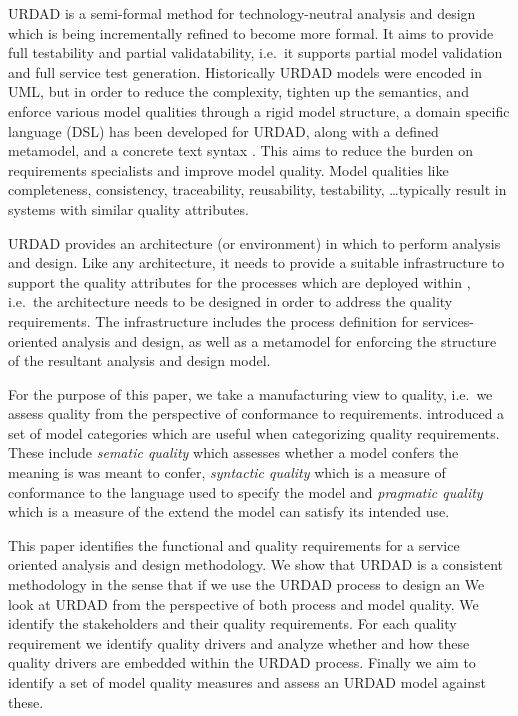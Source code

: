 URDAD is a semi-formal method for technology-neutral analysis and design \cite{solms_urdad_2010} which is being incrementally refined to become more formal. It aims to provide full testability and partial validatability, i.e.\ it supports partial model validation and full service test generation. Historically URDAD models were encoded in UML, but in order to reduce the complexity, tighten up the semantics, and enforce various model qualities through a rigid model structure, a domain specific language (DSL) has been developed for URDAD, along with a defined metamodel, and a concrete text syntax \cite{solmsfritz_domain-specific_????}. This aims to reduce the burden on requirements specialists and improve model quality. Model qualities like completeness, consistency, traceability, reusability, testability, \dots typically result in systems with similar quality attributes\cite{findItIfYouCan}.

URDAD provides an architecture (or environment) in which to perform analysis and design. Like any architecture, it needs to provide a suitable infrastructure to support the quality attributes for the processes which are deployed within \cite{}, i.e.\ the architecture needs to be designed in order to address the quality requirements. The infrastructure includes the process definition for services-oriented analysis and design, as well as a metamodel for enforcing the structure of the resultant analysis and design model.

For the purpose of this paper, we take a manufacturing view \cite{garvin_what_1984} to quality, i.e.\  we assess quality from the perspective of conformance to requirements. \cite{lindland_understanding_1994} introduced a set of model categories which are useful when categorizing quality requirements. These include \emph{sematic quality} which assesses whether a model confers the meaning is was meant to confer, \emph{syntactic quality} which is a measure of conformance to the language used to specify the model and \emph{pragmatic quality} which is a measure of the extend the model can satisfy its intended use.

This paper identifies the functional and quality requirements for a service oriented analysis and design methodology. We show that URDAD is a consistent methodology in the sense that if we use the URDAD process to design an
We look at URDAD from the perspective of both process and model quality. We identify the stakeholders and their quality requirements. For each quality requirement we identify quality drivers and analyze whether and how these quality drivers are embedded within the URDAD process. Finally we aim to identify a set of model quality measures and assess an URDAD model against these.
